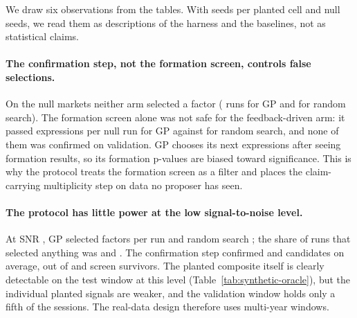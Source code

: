 \begin{table}[t]
\centering
\caption{Null markets (SNR $0$, \SynNullSeeds{} seeds): runs that selected
at least one factor, and the selection funnel (mean $\pm$ sd across runs).
Every factor selected here would be a false discovery. Synthetic data only.}
\label{tab:synthetic-null}
\resizebox{\textwidth}{!}{}
\end{table}

\begin{table}[t]
\centering
\caption{Oracle reference: test-window mean IC (Newey--West $t$) of the planted
signals and of their equal-weight composite, per planted market, and the
share of planted signals that pass BH at \SynTestAlpha{} on the test window
(power). Synthetic data only.}
\label{tab:synthetic-oracle}
\resizebox{\textwidth}{!}{}
\end{table}

We draw six observations from the tables. With \SynSeeds{} seeds per planted
cell and \SynNullSeeds{} null seeds, we read them as descriptions of the
harness and the baselines, not as statistical claims.

\paragraph{The confirmation step, not the formation screen, controls false
selections.} On the null markets neither arm selected a factor
( runs for GP and 
for random search). The formation screen alone was not safe for the
feedback-driven arm: it passed 
expressions per null run for GP against
 for random search, and none of
them was confirmed on validation. GP chooses its next expressions after
seeing formation results, so its formation p-values are biased toward
significance. This is why the protocol treats the formation screen as a
filter and places the claim-carrying multiplicity step on data no proposer
has seen.

\paragraph{The protocol has little power at the low signal-to-noise level.}
At SNR \SynSnrLow{}, GP selected 
factors per run and random search ; the
share of runs that selected anything was
 and
. The confirmation step confirmed
 and
 candidates on average, out of
 and
 screen survivors. The planted
composite itself is clearly detectable on the test window at this level
(Table~\ref{tab:synthetic-oracle}), but the individual planted signals are
weaker, and the validation window holds only a fifth of the sessions. The
real-data design therefore uses multi-year windows.

